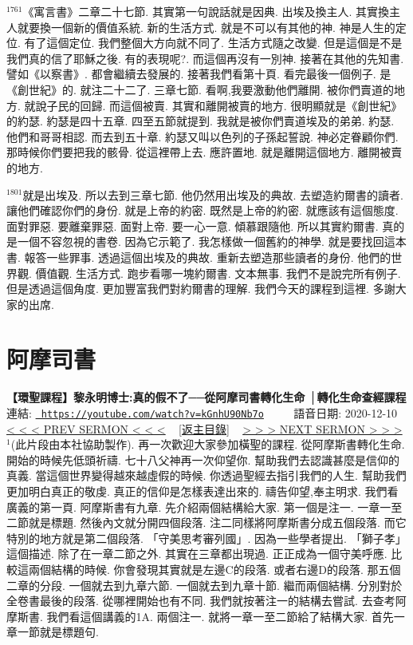\documentclass{book}
\begin{document}
$^{1761}$《寓言書》二章二十七節.
其實第一句說話就是因典.
出埃及換主人.
其實換主人就要換一個新的價值系統.
新的生活方式.
就是不可以有其他的神.
神是人生的定位.
有了這個定位.
我們整個大方向就不同了.
生活方式隨之改變.
但是這個是不是我們真的信了耶穌之後.
有的表現呢?.
而這個再沒有一別神.
接著在其他的先知書.
譬如《以察書》.
都會繼續去發展的.
接著我們看第十頁.
看完最後一個例子.
是《創世紀》的.
就注二十二了.
三章七節.
看啊,我要激動他們離開.
被你們賣道的地方.
就說子民的回歸.
而這個被賣.
其實和離開被賣的地方.
很明顯就是《創世紀》的約瑟.
約瑟是四十五章.
四至五節就提到.
我就是被你們賣道埃及的弟弟.
約瑟.
他們和哥哥相認.
而去到五十章.
約瑟又叫以色列的子孫起誓說.
神必定眷顧你們.
那時候你們要把我的骸骨.
從這裡帶上去.
應許置地.
就是離開這個地方.
離開被賣的地方.

$^{1801}$就是出埃及.
所以去到三章七節.
他仍然用出埃及的典故.
去塑造約爾書的讀者.
讓他們確認你們的身份.
就是上帝的約密.
既然是上帝的約密.
就應該有這個態度.
面對罪惡.
要離棄罪惡.
面對上帝.
要一心一意.
傾慕跟隨他.
所以其實約爾書.
真的是一個不容忽視的書卷.
因為它示範了.
我怎樣做一個舊約的神學.
就是要找回這本書.
報答一些罪事.
透過這個出埃及的典故.
重新去塑造那些讀者的身份.
他們的世界觀.
價值觀.
生活方式.
跑步看哪一塊約爾書.
文本無事.
我們不是說完所有例子.
但是透過這個角度.
更加豐富我們對約爾書的理解.
我們今天的課程到這裡.
多謝大家的出席.
\newpage



\section{阿摩司書}
\label{sec:kGnhU90Nb7o}
\textbf{【環聖課程】黎永明博士:真的假不了──從阿摩司書轉化生命 │轉化生命查經課程}
\newline
\newline
連結: \href{https://youtube.com/watch?v=kGnhU90Nb7o}{\texttt{ https://youtube.com/watch?v=kGnhU90Nb7o}} ~~~~ 語音日期: 2020-12-10 
\newline
\newline
\hyperref[sec:ovzkHTnXBCk]{\small{< < < PREV SERMON < < <}}
~
\hyperref[sec:index]{\small{[返主目錄]}}
~
\hyperref[sec:7wbezlnJO0Q]{\small{> > > NEXT SERMON > > >}}
\newline
\newline
$^{1}$(此片段由本社協助製作).
再一次歡迎大家參加橫聖的課程.
從阿摩斯書轉化生命.
開始的時候先低頭祈禱.
七十八父神再一次仰望你.
幫助我們去認識甚麼是信仰的真義.
當這個世界變得越來越虛假的時候.
你透過聖經去指引我們的人生.
幫助我們更加明白真正的敬虔.
真正的信仰是怎樣表達出來的.
禱告仰望,奉主明求.
我們看廣義的第一頁.
阿摩斯書有九章.
先介紹兩個結構給大家.
第一個是注一.
一章一至二節就是標題.
然後內文就分開四個段落.
注二同樣將阿摩斯書分成五個段落.
而它特別的地方就是第二個段落.
「守美思考審列國」.
因為一些學者提出.
「獅子孝」這個描述.
除了在一章二節之外.
其實在三章都出現過.
正正成為一個守美呼應.
比較這兩個結構的時候.
你會發現其實就是左邊C的段落.
或者右邊D的段落.
那五個二章的分段.
一個就去到九章六節.
一個就去到九章十節.
繼而兩個結構.
分別對於全卷書最後的段落.
從哪裡開始也有不同.
我們就按著注一的結構去嘗試.
去查考阿摩斯書.
我們看這個講義的1A.
兩個注一.
就將一章一至二節給了結構大家.
首先一章一節就是標題句.
\end{document}
